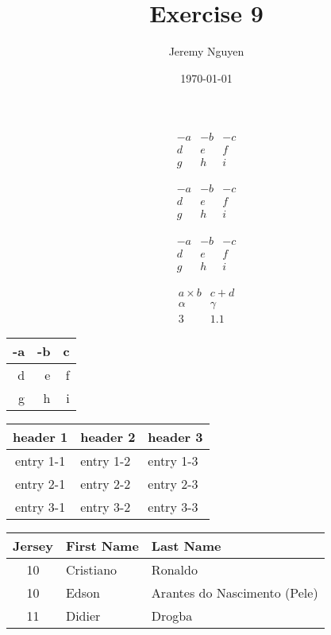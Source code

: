 \documentclass[11pt]{article}
\begin{document}
\title{Exercise 9}
\author{Jeremy Nguyen}
\date{\today}
\maketitle

\[
	\begin{array}{ccc}
		-a & -b & -c \\
		d  & e  & f  \\
		g  & h  & i
	\end{array}
\]

\[
	\begin{array}{rrr}
		-a & -b & -c \\
		d  & e  & f  \\
		g  & h  & i
	\end{array}
\]

\[
	\begin{array}{r|rr}
		-a & -b & -c \\
		\hline
		d  & e  & f  \\
		\hline
		g  & h  & i
	\end{array}
\]

\[
	\begin{array}{||r|l||}
		a \times b & c + d  \\
		\alpha     & \gamma \\
		\hline
		3          & 1.1
	\end{array}
\]

\begin{tabular}{r||r|r}
	-a & -b & c \\
	\hline\hline
	d  & e  & f \\
	\hline
	g  & h  & i
\end{tabular}

\begin{tabular}{c||l|l}
	header 1  & header 2  & header 3  \\
	\hline\hline
	entry 1-1 & entry 1-2 & entry 1-3 \\
	\hline
	entry 2-1 & entry 2-2 & entry 2-3 \\
	\hline
	entry 3-1 & entry 3-2 & entry 3-3 \\
\end{tabular}

\begin{center}
	\begin{tabular}{c||l|l}
		Jersey & First Name & Last Name                    \\
		\hline\hline
		10     & Cristiano  & Ronaldo                      \\
		\hline
		10     & Edson      & Arantes do Nascimento (Pele) \\
		\hline
		11     & Didier     & Drogba                       \\
	\end{tabular}
\end{center}
\end{document}
